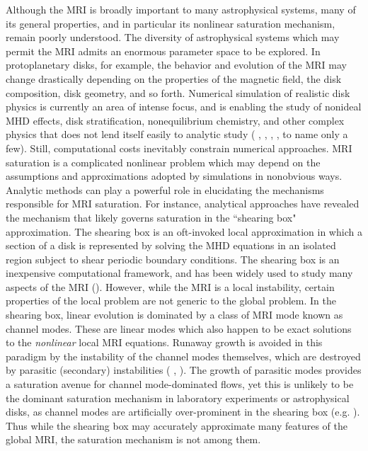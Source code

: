 \documentclass{emulateapj}
\newcommand{\citei}[1]{\citeauthor{#1} \citeyear{#1}}
\begin{document}
Although the MRI is broadly important to many astrophysical systems, many of its general properties, and in particular its nonlinear saturation mechanism, remain poorly understood. The diversity of astrophysical systems which may permit the MRI admits an enormous parameter space to be explored. In protoplanetary disks, for example, the behavior and evolution of the MRI may change drastically depending on the properties of the magnetic field, the disk composition, disk geometry, and so forth. Numerical simulation of realistic disk physics is currently an area of intense focus, and is enabling the study of nonideal MHD effects, disk stratification, nonequilibrium chemistry, and other complex physics that does not lend itself easily to analytic study (\citei{Fleming:2003fs}, \citei{Bai:2011cm}, \citei{Flock:2013}, \citei{Suzuki:2014vh}, to name only a few). Still, computational costs inevitably constrain numerical approaches. MRI saturation is a complicated nonlinear problem which may depend on the assumptions and approximations adopted by simulations in nonobvious ways. Analytic methods can play a powerful role in elucidating the mechanisms responsible for MRI saturation. For instance, analytical approaches have revealed the mechanism that likely governs saturation in the ``shearing box" approximation. The shearing box is an oft-invoked local approximation in which a section of a disk is represented by solving the MHD equations in an isolated region subject to shear periodic boundary conditions. The shearing box is an inexpensive computational framework, and has been widely used to study many aspects of the MRI (). However, while the MRI is a local instability, certain properties of the local problem are not generic to the global problem. In the shearing box, linear evolution is dominated by a class of MRI mode known as channel modes. These are linear modes which also happen to be exact solutions to the \textit{nonlinear} local MRI equations. Runaway growth is avoided in this paradigm by the instability of the channel modes themselves, which are destroyed by parasitic (secondary) instabilities (\citei{Goodman:1994ul}, \citei{Pessah:2010ic}). The growth of parasitic modes provides a saturation avenue for channel mode-dominated flows, yet this is unlikely to be the dominant saturation mechanism in laboratory experiments or astrophysical disks, as channel modes are artificially over-prominent in the shearing box (e.g. \citei{Latter:2015}). Thus while the shearing box may accurately approximate many features of the global MRI, the saturation mechanism is not among them. 
\end{document}
